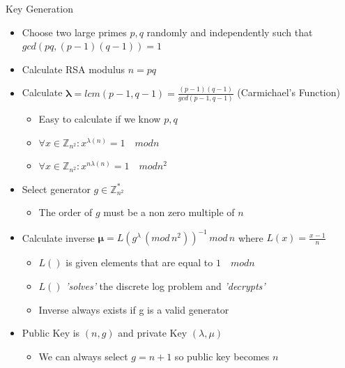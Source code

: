 \documentclass{beamer}
\begin{document}
\begin{frame}{Key Generation} 
\begin{itemize}
\item Choose two large primes $p,q$ randomly and independently such that $gcd(p  q,(p-1)  (q-1))=1$
\item Calculate RSA modulus $ n = pq $ 
\item Calculate $ \bm{\lambda} = lcm(p-1,q-1)= \frac{(p-1)  (q-1)}{gcd(p-1,q-1)} $ (Carmichael's Function)
\begin{itemize}
	\item Easy to calculate if we know $p,q$
	\item $ \forall x \in \mathbb{Z}_{n^2}: x^{\lambda(n)} =  1 \quad mod n $
	\item $ \forall x \in \mathbb{Z}_{n^2}: x^{n  \lambda(n)} =  1 \quad mod n^2 $
\end{itemize}
\item Select generator $g \in \mathbb{Z}^{*}_{n^2}$
\begin{itemize}
	\item The order of $g$ must be a non zero multiple of $n$
\end{itemize}
\item Calculate inverse  $\bm{\mu} = L(g^\lambda \, ( mod \, n^2 ) )^{-1} \, mod \, n$  where  $L(x) = \frac{x-1}{n} $
\begin{itemize}
\item $L()$ is given elements that are equal to $1 \quad mod n$
\item $L()$ \textit{'solves'} the discrete log problem and \textit{'decrypts'}
\item Inverse always exists if g is a valid generator
\end{itemize}
\item Public Key is $(n,g)$ and private Key $(\lambda,\mu)$ 
\begin{itemize}
	\item We can always select $g = n+1$ so public key becomes $n$
\end{itemize}
\end{itemize} 
\end{frame}
\end{document}
